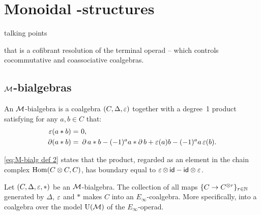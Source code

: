 
\section{Monoidal \pdfEinfty-structures}

talking points

that is a cofibrant resolution of the terminal operad -- which controls cocommutative and coassociative coalgebras.

\subsection{$\mathcal{M}$-bialgebras}

\begin{definition*}
	An $\mathcal{M}$-bialgebra is a coalgebra $(C, \Delta, \operatorname{\varepsilon})$ together with a degree~1 product satisfying for any $a,b \in C$ that:
	\begin{align}
		\label{eq:M-bialg def 1}
		\operatorname{\varepsilon}(a \ast b) =\ & 0, \\
		\label{eq:M-bialg def 2}
		\operatorname{\partial} (a \ast b) =\ & \operatorname{\partial} a \ast b - (-1)^{a} a \ast \operatorname{\partial} b + \operatorname{\varepsilon}(a) b - (-1)^{a} a \operatorname{\varepsilon}(b).
	\end{align}
\end{definition*}

\begin{remark*}
	\cref{eq:M-bialg def 2} states that the product, regarded as an element in the chain complex $\mathrm{Hom}(C \otimes C, C)$, has boundary equal to $\operatorname{\varepsilon} \otimes\, \mathsf{id} - \mathsf{id} \otimes \operatorname{\varepsilon}$.
\end{remark*}

\begin{proposition*}
	Let $(C, \Delta, \operatorname{\varepsilon}, \ast)$ be an $\mathcal{M}$-bialgebra.
	The collection of all maps $\{C \to C^{\otimes r}\}_{r \in \mathbb{N}}$ generated by $\Delta$, $\operatorname{\varepsilon}$ and $\ast$ makes $C$ into an $E_\infty$-coalgebra.
	More specifically, into a coalgebra over the model ${\operatorname{U}(\mathcal{M})}$ of the $E_\infty$-operad.
\end{proposition*}

